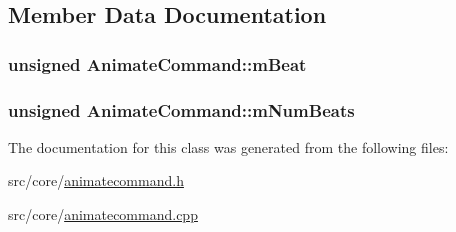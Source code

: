 \subsection{Member Data Documentation}
\hypertarget{a00003_af6ac5dcbcef33378b6729eec09f9dbc4}{
\subsubsection[{m\-Beat}]{\setlength{\rightskip}{0pt plus 5cm}unsigned Animate\-Command\-::m\-Beat\hspace{0.3cm}{\ttfamily [protected]}}}\label{a00003_af6ac5dcbcef33378b6729eec09f9dbc4}
\hypertarget{a00003_a6bc20b1356872227a55ba176ec85fa1f}{
\subsubsection[{m\-Num\-Beats}]{\setlength{\rightskip}{0pt plus 5cm}unsigned Animate\-Command\-::m\-Num\-Beats\hspace{0.3cm}{\ttfamily [protected]}}}\label{a00003_a6bc20b1356872227a55ba176ec85fa1f}


The documentation for this class was generated from the following files\-:\begin{DoxyCompactItemize}
\item 
src/core/\hyperlink{a00198}{animatecommand.\-h}\item 
src/core/\hyperlink{a00197}{animatecommand.\-cpp}\end{DoxyCompactItemize}
